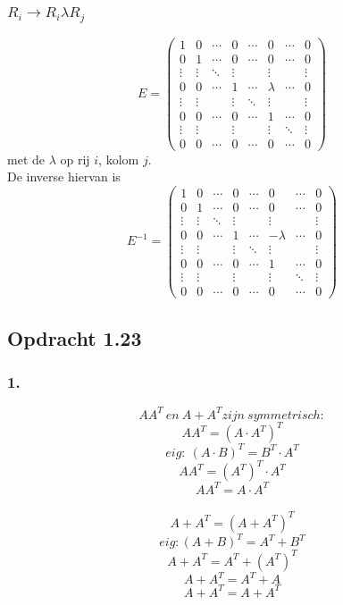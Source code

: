 \documentclass[lineaire_algebra_oplossingen.tex]{subfiles}
\begin{document}
\subsubsection*{$R_i \rightarrow R_i \lambda R_j$}
\[
E=
\begin{pmatrix}
1 & 0 & \cdots & 0 & \cdots & 0 & \cdots & 0\\
0 & 1 & \cdots & 0 & \cdots & 0 & \cdots & 0\\
\vdots & \vdots & \ddots & \vdots& & \vdots & &\vdots\\
0 & 0 & \cdots & 1 & \cdots & \lambda & \cdots & 0\\
\vdots & \vdots & & \vdots& \ddots & \vdots & &\vdots\\
0 & 0 & \cdots & 0 & \cdots & 1 & \cdots & 0\\
\vdots & \vdots & & \vdots & & \vdots & \ddots & \vdots\\
0 & 0 & \cdots & 0 & \cdots & 0 & \cdots & 0
\end{pmatrix}
\]
met de $\lambda$ op rij $i$, kolom $j$.\\
De inverse hiervan is 
\[
E^{-1}=
\begin{pmatrix}
1 & 0 & \cdots & 0 & \cdots & 0 & \cdots & 0\\
0 & 1 & \cdots & 0 & \cdots & 0 & \cdots & 0\\
\vdots & \vdots & \ddots & \vdots& & \vdots & &\vdots\\
0 & 0 & \cdots & 1 & \cdots & -\lambda & \cdots & 0\\
\vdots & \vdots & & \vdots& \ddots & \vdots & &\vdots\\
0 & 0 & \cdots & 0 & \cdots & 1 & \cdots & 0\\
\vdots & \vdots & & \vdots & & \vdots & \ddots & \vdots\\
0 & 0 & \cdots & 0 & \cdots & 0 & \cdots & 0
\end{pmatrix}
\]

\subsection{Opdracht 1.23}
\label{1.23}
\subsubsection*{1.}
\[
AA^T \ en \ A + A^T zijn \ symmetrisch:
\]
\[
AA^T = (A\cdot A^T)^T
\]
$$eig: \ (A\cdot B)^T = B^T \cdot A^T $$
$$AA^T = (A^T)^T \cdot A^T$$
$$AA^T = A \cdot A^T$$
\\
$$A +A^T = (A +A^T)^T$$
$$eig: (A+B)^T = A^T + B^T$$
$$A +A^T = A^T + (A^T)^T$$
$$A +A^T = A^T + A$$
$$A +A^T = A + A^T$$
\end{document}

